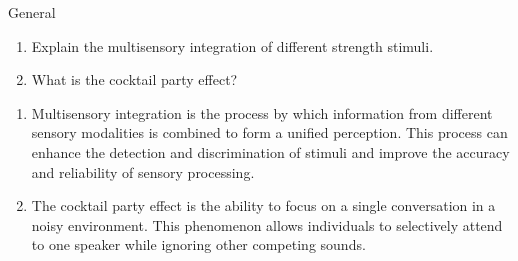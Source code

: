 \documentclass{article}
\begin{document}
\begin{exercise}{General}
  \begin{enumerate}
    \item Explain the multisensory integration of different strength stimuli.
    \item What is the cocktail party effect?
  \end{enumerate}

  \begin{solution}
    \begin{enumerate}
      \item Multisensory integration is the process by which information from different sensory modalities is combined to form a unified perception. This process can enhance the detection and discrimination of stimuli and improve the accuracy and reliability of sensory processing.
      \item The cocktail party effect is the ability to focus on a single conversation in a noisy environment. This phenomenon allows individuals to selectively attend to one speaker while ignoring other competing sounds.
    \end{enumerate}
  \end{solution}
\end{exercise}
\end{document}
